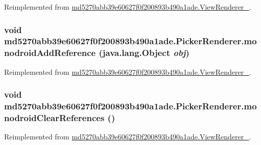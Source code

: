 Reimplemented from \hyperlink{classmd5270abb39e60627f0f200893b490a1ade_1_1_view_renderer__2_30528b2f26688d4ae24a58b2a1865a93}{md5270abb39e60627f0f200893b490a1ade.ViewRenderer\_}.\hypertarget{classmd5270abb39e60627f0f200893b490a1ade_1_1_picker_renderer_777d5b35ed425b737ed67a6488c800c8}{
\subsubsection[{monodroidAddReference}]{\setlength{\rightskip}{0pt plus 5cm}void md5270abb39e60627f0f200893b490a1ade.PickerRenderer.monodroidAddReference (java.lang.Object {\em obj})}}
\label{classmd5270abb39e60627f0f200893b490a1ade_1_1_picker_renderer_777d5b35ed425b737ed67a6488c800c8}




Reimplemented from \hyperlink{classmd5270abb39e60627f0f200893b490a1ade_1_1_view_renderer__2_04a86dd6eb699648d23fe42d567c6962}{md5270abb39e60627f0f200893b490a1ade.ViewRenderer\_}.\hypertarget{classmd5270abb39e60627f0f200893b490a1ade_1_1_picker_renderer_8ea4822897e59386ee80a0fccf40c367}{
\subsubsection[{monodroidClearReferences}]{\setlength{\rightskip}{0pt plus 5cm}void md5270abb39e60627f0f200893b490a1ade.PickerRenderer.monodroidClearReferences ()}}
\label{classmd5270abb39e60627f0f200893b490a1ade_1_1_picker_renderer_8ea4822897e59386ee80a0fccf40c367}




Reimplemented from \hyperlink{classmd5270abb39e60627f0f200893b490a1ade_1_1_view_renderer__2_4832372c2c5755cd4e9f279f9b051454}{md5270abb39e60627f0f200893b490a1ade.ViewRenderer\_}.

